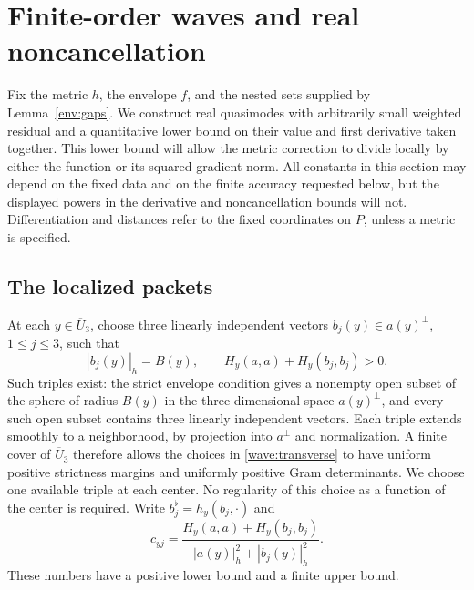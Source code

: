 \section{Finite-order waves and real noncancellation}
\label{sec:four-waves}

Fix the metric $h$, the envelope $f$, and the nested sets supplied by
Lemma~\ref{env:gaps}. We construct real quasimodes with arbitrarily
small weighted residual and a quantitative lower bound on their value
and first derivative taken together. This lower bound will allow the
metric correction to divide locally by either the function or its
squared gradient norm. All constants in this section may depend on the
fixed data and on the finite accuracy requested below, but the displayed
powers in the derivative and noncancellation bounds will not.
Differentiation and distances refer to the fixed coordinates on $P$,
unless a metric is specified.

\subsection{The localized packets}

At each $y\in\overline U_3$, choose three linearly independent vectors
$b_j(y)\in a(y)^\perp$, $1\le j\le3$, such that
\begin{equation}
 |b_j(y)|_h=B(y),\qquad
 H_y(a,a)+H_y(b_j,b_j)>0.
 \label{wave:transverse}
\end{equation}
Such triples exist: the strict envelope condition gives a nonempty open
subset of the sphere of radius $B(y)$ in the three-dimensional space
$a(y)^\perp$, and every such open subset contains three linearly
independent vectors. Each triple extends smoothly to a neighborhood,
by projection into $a^\perp$ and normalization. A finite cover of
$\overline U_3$ therefore allows the choices in
\eqref{wave:transverse} to have uniform positive strictness margins and
uniformly positive Gram determinants. We choose one available triple at
each center. No regularity of this choice as a function of the center is
required. Write $b_j^\flat=h_y(b_j,\cdot)$ and
\[
 c_{yj}=\frac{H_y(a,a)+H_y(b_j,b_j)}{|a(y)|_h^2+|b_j(y)|_h^2}.
\]
These numbers have a positive lower bound and a finite upper bound.

